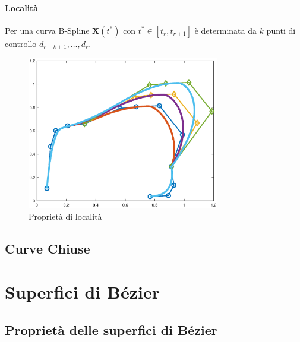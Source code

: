 \documentclass[a4paper, 10pt]{article}
\begin{document}
\paragraph{Località} Per una curva B-Spline $\mathbf{X}(t^*)$ con $t^* \in [t_r, t_{r+1}]$ è determinata da 
$k$ punti di controllo $d_{r-k+1}, \dots, d_{r}$. 
\begin{figure}[h]
  \centering
  \includegraphics[width=0.75\textwidth]{figure/loc_spline.eps}
  \caption{Proprietà di località}
  \label{fig:trasformationspline}
\end{figure} 

\subsection{Curve Chiuse}
\section{Superfici di Bézier}
\subsection{Proprietà delle superfici di Bézier}
\end{document}
